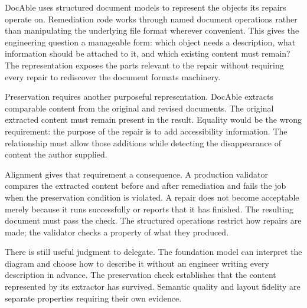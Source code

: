 DocAble uses structured document models to represent the objects its repairs operate on. Remediation code works through named document operations rather than manipulating the underlying file format wherever convenient. This gives the engineering question a manageable form: which object needs a description, what information should be attached to it, and which existing content must remain? The representation exposes the parts relevant to the repair without requiring every repair to rediscover the document format\textquotesingle s machinery.


Preservation requires another purposeful representation. DocAble extracts comparable content from the original and revised documents. The original extracted content must remain present in the result. Equality would be the wrong requirement: the purpose of the repair is to add accessibility information. The relationship must allow those additions while detecting the disappearance of content the author supplied.


Alignment gives that requirement a consequence. A production validator compares the extracted content before and after remediation and fails the job when the preservation condition is violated. A repair does not become acceptable merely because it runs successfully or reports that it has finished. The resulting document must pass the check. The structured operations restrict how repairs are made; the validator checks a property of what they produced.


There is still useful judgment to delegate. The foundation model can interpret the diagram and choose how to describe it without an engineer writing every description in advance. The preservation check establishes that the content represented by its extractor has survived. Semantic quality and layout fidelity are separate properties requiring their own evidence.

